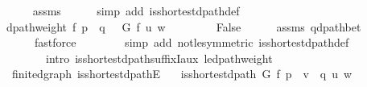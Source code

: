 \begin{isabellebody}
\ \ \ \ \isamarkupfalse%
\ assms\isanewline
\ \ \ \ \isamarkupfalse%
\ {\isacharparenleft}{\kern0pt}simp\ add{\isacharcolon}{\kern0pt}\ is{\isacharunderscore}{\kern0pt}shortest{\isacharunderscore}{\kern0pt}dpath{\isacharunderscore}{\kern0pt}def{\isacharparenright}{\kern0pt}\isanewline
\ \ \isamarkupfalse%
\ \isamarkupfalse%
\ {\isachardoublequoteopen}dpath{\isacharunderscore}{\kern0pt}weight\ f\ {\isacharparenleft}{\kern0pt}p\ {\isacharat}{\kern0pt}\ q{\isacharprime}{\kern0pt}{\isacharparenright}{\kern0pt}\ {\isacharless}{\kern0pt}\ {\isasymdelta}\ G\ f\ u\ w{\isachardoublequoteclose}\isanewline
\ \ \ \ \isacommand{{\isachardot}{\kern0pt}}\isamarkupfalse%
\isanewline
\ \ \isamarkupfalse%
\ {\isachardoublequoteopen}False{\isachardoublequoteclose}\isanewline
\ \ \ \ \isamarkupfalse%
\ assms\ q{\isacharprime}{\kern0pt}{\isacharunderscore}{\kern0pt}dpath{\isacharunderscore}{\kern0pt}bet\isanewline
\ \ \ \ \isamarkupfalse%
\isanewline
\ \ \ \ \ \ {\isacharparenleft}{\kern0pt}fastforce\isanewline
\ \ \ \ \ \ \ \ simp\ add{\isacharcolon}{\kern0pt}\ not{\isacharunderscore}{\kern0pt}le{\isacharbrackleft}{\kern0pt}symmetric{\isacharbrackright}{\kern0pt}\ is{\isacharunderscore}{\kern0pt}shortest{\isacharunderscore}{\kern0pt}dpath{\isacharunderscore}{\kern0pt}def\isanewline
\ \ \ \ \ \ \ \ intro{\isacharcolon}{\kern0pt}\ is{\isacharunderscore}{\kern0pt}shortest{\isacharunderscore}{\kern0pt}dpath{\isacharunderscore}{\kern0pt}suffixI{\isacharunderscore}{\kern0pt}aux\ {\isasymdelta}{\isacharunderscore}{\kern0pt}le{\isacharunderscore}{\kern0pt}dpath{\isacharunderscore}{\kern0pt}weight{\isacharparenright}{\kern0pt}\isanewline
{}\isamarkupfalse%
%
\endisatagproof
{\isafoldproof}%
%
\isadelimproof
\isanewline
%
\endisadelimproof
%
\isadeliminvisible
\isanewline
%
\endisadeliminvisible
%
\isataginvisible
{}\isamarkupfalse%
\ {\isacharparenleft}{\kern0pt}\ finite{\isacharunderscore}{\kern0pt}dgraph{\isacharparenright}{\kern0pt}\ is{\isacharunderscore}{\kern0pt}shortest{\isacharunderscore}{\kern0pt}dpathE{\isacharcolon}{\kern0pt}\isanewline
\ \ \ {\isachardoublequoteopen}is{\isacharunderscore}{\kern0pt}shortest{\isacharunderscore}{\kern0pt}dpath\ G\ f\ {\isacharparenleft}{\kern0pt}p\ {\isacharat}{\kern0pt}\ {\isacharbrackleft}{\kern0pt}v{\isacharbrackright}{\kern0pt}\ {\isacharat}{\kern0pt}\ q{\isacharparenright}{\kern0pt}\ u\ w{\isachardoublequoteclose}\isanewline
\ \ \isanewline

\end{isabellebody}
